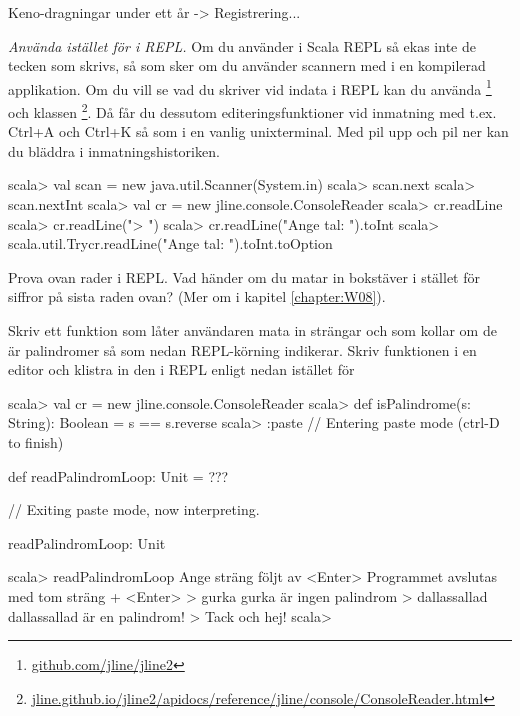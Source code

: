 \Task \TODO Keno-dragningar under ett år -> Registrering...

\Task \emph{Använda  istället för  i REPL.} Om du använder   i Scala REPL så ekas inte de tecken som skrivs, så som sker om du använder scannern med  i en kompilerad applikation. Om du vill se vad du skriver vid indata i REPL kan du använda \footnote{
\href{https://github.com/jline/jline2}{github.com/jline/jline2}
} och klassen \footnote{
\href{http://jline.github.io/jline2/apidocs/reference/jline/console/ConsoleReader.html}{jline.github.io/jline2/apidocs/reference/jline/console/ConsoleReader.html}}. 
Då får du dessutom editeringsfunktioner vid inmatning med t.ex. Ctrl+A och Ctrl+K så som i en vanlig unixterminal. Med pil upp och pil ner kan du bläddra i inmatningshistoriken.
\begin{REPL}
scala> val scan = new java.util.Scanner(System.in)
scala> scan.next
scala> scan.nextInt
scala> val cr = new jline.console.ConsoleReader
scala> cr.readLine
scala> cr.readLine("> ")
scala> cr.readLine("Ange tal: ").toInt
scala> scala.util.Try{cr.readLine("Ange tal: ").toInt}.toOption
\end{REPL} 

\Subtask Prova ovan rader i REPL. Vad händer om du matar in bokstäver i stället för siffror på sista raden ovan? (Mer om  i kapitel \ref{chapter:W08}).

\Subtask Skriv ett funktion  som låter användaren mata in strängar och som kollar om de är palindromer så som nedan REPL-körning indikerar. Skriv funktionen i en editor och klistra in den i REPL enligt nedan istället för 

\begin{REPL}
scala> val cr = new jline.console.ConsoleReader
scala> def isPalindrome(s: String): Boolean = s == s.reverse
scala> :paste 
// Entering paste mode (ctrl-D to finish)

def readPalindromLoop: Unit = ???

// Exiting paste mode, now interpreting.

readPalindromLoop: Unit

scala> readPalindromLoop
Ange sträng följt av <Enter>
Programmet avslutas med tom sträng + <Enter>
> gurka
gurka är ingen palindrom
> dallassallad
dallassallad är en palindrom!
> 
Tack och hej!
scala>
\end{REPL}

